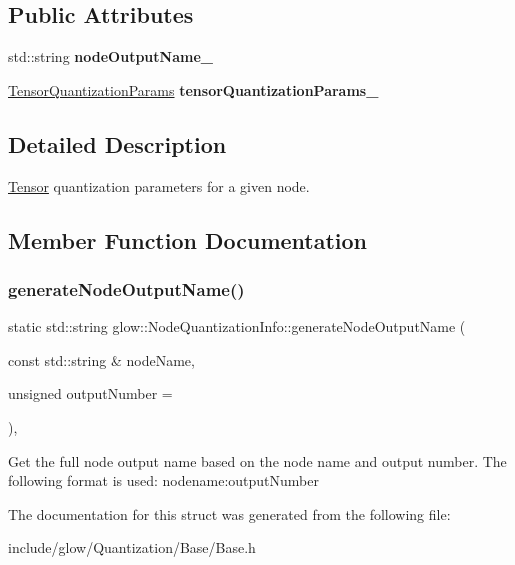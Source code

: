 \subsection*{Public Attributes}
\begin{DoxyCompactItemize}
\item 
\mbox{\label{structglow_1_1_node_quantization_info_a8236317f6635e7dd3ef365ed35fd754b}} 
std\+::string {\bfseries node\+Output\+Name\+\_\+}
\item 
\mbox{\label{structglow_1_1_node_quantization_info_a3ff1014f217f2ac53b0abb6fb113f9a7}} 
\hyperlink{structglow_1_1_tensor_quantization_params}{Tensor\+Quantization\+Params} {\bfseries tensor\+Quantization\+Params\+\_\+}
\end{DoxyCompactItemize}


\subsection{Detailed Description}
\hyperlink{classglow_1_1_tensor}{Tensor} quantization parameters for a given node. 

\subsection{Member Function Documentation}
\mbox{\label{structglow_1_1_node_quantization_info_a95eecb61266bd5b736d50b7904a6c95d}} 
\subsubsection{\texorpdfstring{generate\+Node\+Output\+Name()}{generateNodeOutputName()}}
{\footnotesize\ttfamily static std\+::string glow\+::\+Node\+Quantization\+Info\+::generate\+Node\+Output\+Name (\begin{DoxyParamCaption}\item[{const std\+::string \&}]{node\+Name,  }\item[{unsigned}]{output\+Number = {} }\end{DoxyParamCaption})\hspace{0.3cm}{\ttfamily [inline]}, {\ttfamily [static]}}

Get the full node output name based on the node name and output number. The following format is used\+: nodename\+:output\+Number 

The documentation for this struct was generated from the following file\+:\begin{DoxyCompactItemize}
\item 
include/glow/\+Quantization/\+Base/Base.\+h\end{DoxyCompactItemize}
